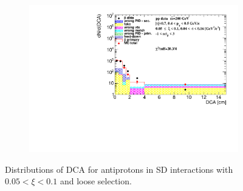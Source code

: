 \begin{figure}[h!]
\begin{subfigure}{.45\textwidth}
		\includegraphics[width=\linewidth, page=14]{chapters/chrgSTAR/img/DCAproton/background_p_bar_1.pdf}
	\end{subfigure}
	\caption{Distributions of DCA for antiprotons in SD interactions with $0.05 < \xi<0.1$ and loose selection.}
	\label{fig:dca_proton_bar_1}
\end{figure}
